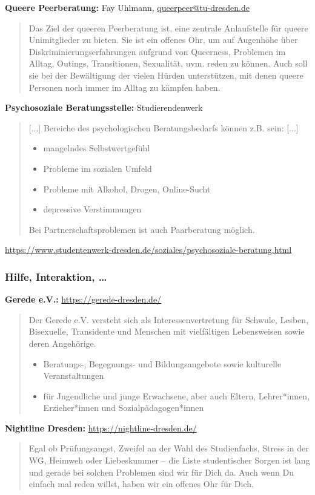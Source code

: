 \documentclass{beamer}
\begin{document}
{\begin{frame}
	\textbf{Queere Peerberatung:} Fay Uhlmann, \hyperref{mailto:queerpeer@tu-dresden.de}{}{}{queerpeer@tu-dresden.de}

	\begin{quote}
		Das Ziel der queeren Peerberatung ist, eine zentrale Anlaufstelle für queere Unimitglieder zu bieten. Sie ist ein offenes Ohr, um auf Augenhöhe über Diskriminierungserfahrungen aufgrund von Queerness, Problemen im Alltag, Outings, Transitionen, Sexualität, uvm. reden zu können. Auch soll sie bei der Bewältigung der vielen Hürden unterstützen, mit denen queere Personen noch immer im Alltag zu kämpfen haben.
	\end{quote}

	\textbf{Psychosoziale Beratungsstelle:} Studierendenwerk
	\begin{quote}
		[...]
		Bereiche des psychologischen Beratungsbedarfs können z.B. sein: [...]
		\begin{itemize}
			\item mangelndes Selbstwertgefühl
			\item Probleme im sozialen Umfeld
			\item Probleme mit Alkohol, Drogen, Online-Sucht
			\item depressive Verstimmungen
		\end{itemize}
		Bei Partnerschaftsproblemen ist auch Paarberatung möglich.
	\end{quote}
	{\tiny \url{https://www.studentenwerk-dresden.de/soziales/psychosoziale-beratung.html}}
\end{frame}

\begin{frame} \frametitle{Hilfe, Interaktion, \dots}
	\scriptsize
	
	\textbf{Gerede e.V.:} \url{https://gerede-dresden.de/}
	\begin{quote}
		Der Gerede e.V. versteht sich als Interessenvertretung für Schwule, Lesben, Bisexuelle, Transidente und Menschen mit vielfältigen Lebensweisen sowie deren Angehörige. 
		\begin{itemize}
			\item Beratungs-, Begegnungs- und Bildungsangebote sowie kulturelle Veranstaltungen
			\item für Jugendliche und junge Erwachsene, aber auch Eltern, Lehrer*innen, Erzieher*innen und Sozialpädagogen*innen
		\end{itemize}
	\end{quote}
	
		
	\textbf{Nightline Dresden:} \url{https://nightline-dresden.de/}
	\begin{quote}
		Egal ob Prüfungsangst, Zweifel an der Wahl des Studienfachs, Stress in der WG, Heimweh oder Liebeskummer – die Liste studentischer Sorgen ist lang und gerade bei solchen Problemen sind wir für Dich da. Auch wenn Du einfach mal reden willst, haben wir ein offenes Ohr für Dich.
		

\end{quote}
\end{frame}}
\end{document}
